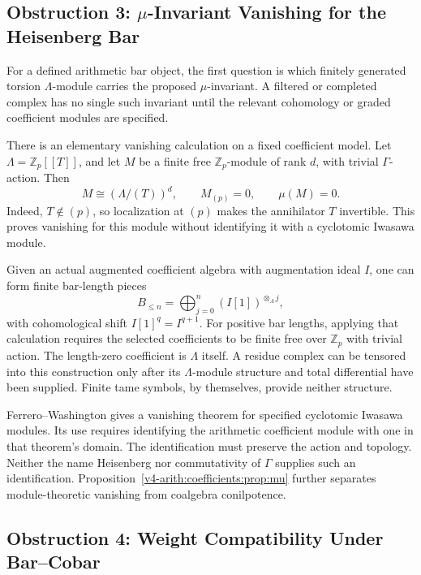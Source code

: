 \subsection{Obstruction 3: \texorpdfstring{\(\mu\)}{mu}-Invariant Vanishing for the Heisenberg Bar}
\label{v4-arith:pos:att-3-mu-heisenberg}

For a defined arithmetic bar object, the first question is which
finitely generated torsion \(\Lambda\)-module carries the proposed
\(\mu\)-invariant. A filtered or completed complex has no single
such invariant until the relevant cohomology or graded coefficient
modules are specified.

There is an elementary vanishing calculation on a fixed coefficient
model. Let \(\Lambda=\mathbb Z_p[[T]]\), and let \(M\) be a finite
free \(\mathbb Z_p\)-module of rank \(d\), with trivial
\(\Gamma\)-action. Then
\[
 M\cong(\Lambda/(T))^d,
 \qquad M_{(p)}=0,
 \qquad \mu(M)=0.
\]
Indeed, \(T\notin(p)\), so localization at \((p)\) makes the
annihilator \(T\) invertible. This proves vanishing for this module
without identifying it with a cyclotomic Iwasawa module.

Given an actual augmented coefficient algebra with augmentation ideal
\(I\), one can form finite bar-length pieces
\[
 B_{\leq n}=\bigoplus_{j=0}^n(I[1])^{\otimes_\Lambda j},
\]
with cohomological shift \(I[1]^q=I^{q+1}\).
For positive bar lengths, applying that calculation requires the
selected coefficients to be finite free over \(\mathbb Z_p\) with
trivial action. The length-zero coefficient is \(\Lambda\) itself. A residue
complex can be tensored into this construction only after its
\(\Lambda\)-module structure and total differential have been supplied.
Finite tame symbols, by themselves, provide neither structure.

Ferrero--Washington gives a vanishing theorem for specified
cyclotomic Iwasawa modules. Its use requires identifying the arithmetic coefficient module
with one in that theorem's domain. The identification must preserve
the action and topology. Neither the name Heisenberg nor commutativity of
\(\Gamma\) supplies such an identification.
Proposition~\ref{v4-arith:coefficients:prop:mu} further separates
module-theoretic vanishing from coalgebra conilpotence.

\subsection{Obstruction 4: Weight Compatibility Under Bar--Cobar}
\label{v4-arith:pos:att-4-weights}

